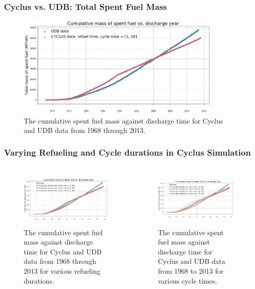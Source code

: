 \begin{frame}
    \frametitle{Cyclus vs. UDB: Total Spent Fuel Mass}
       
    \begin{figure}[htbp!]
      \begin{center}
        \includegraphics[height=5cm]{../figures/cumulative_mass_udb_cyclus}
      \end{center}
            \caption{The cumulative spent fuel mass against discharge time
            for Cyclus and UDB data from 1968 through 2013.}
      \label{fig:totalmass}
    \end{figure}
  \end{frame}

\begin{frame}
    \frametitle{Varying Refueling and Cycle durations in Cyclus Simulation}
    \begin{columns}
        \column[t]{5cm}
        \begin{figure}[htbp!]
        \begin{center}
        \includegraphics[height=2.8cm]{../figures/cumulative_mass_udb_cyclus_refueltime}
        \end{center}
        \caption{The cumulative spent fuel mass against discharge time
        for Cyclus and UDB data from 1968 through 2013 for various
        refueling durations.}
        \end{figure}
        \column[t]{5cm}
        \begin{figure}[htbp!]
            \begin{center}
            \includegraphics[height=2.8cm]{../figures/cumulative_mass_udb_cyclus_cycletime}
            \end{center}
                \caption{The cumulative spent fuel mass against discharge time
                for Cyclus and UDB data from 1968 to 2013 for various cycle
                times.}
            \end{figure}
    \end{columns}
\end{frame}